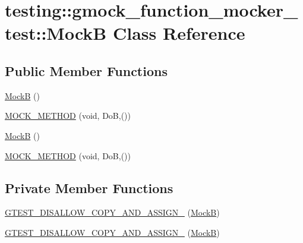 \hypertarget{classtesting_1_1gmock__function__mocker__test_1_1_mock_b}{}\section{testing\+::gmock\+\_\+function\+\_\+mocker\+\_\+test\+::MockB Class Reference}
\label{classtesting_1_1gmock__function__mocker__test_1_1_mock_b}
\subsection*{Public Member Functions}
\begin{DoxyCompactItemize}
\item 
\mbox{\hyperlink{classtesting_1_1gmock__function__mocker__test_1_1_mock_b_a8b1fcf761cea264d7687bd64e1a16fb4}{MockB}} ()
\item 
\mbox{\hyperlink{classtesting_1_1gmock__function__mocker__test_1_1_mock_b_a4e897dd85777bec4fae42b78d4222f9b}{M\+O\+C\+K\+\_\+\+M\+E\+T\+H\+OD}} (void, DoB,())
\item 
\mbox{\hyperlink{classtesting_1_1gmock__function__mocker__test_1_1_mock_b_a8b1fcf761cea264d7687bd64e1a16fb4}{MockB}} ()
\item 
\mbox{\hyperlink{classtesting_1_1gmock__function__mocker__test_1_1_mock_b_a4e897dd85777bec4fae42b78d4222f9b}{M\+O\+C\+K\+\_\+\+M\+E\+T\+H\+OD}} (void, DoB,())
\end{DoxyCompactItemize}
\subsection*{Private Member Functions}
\begin{DoxyCompactItemize}
\item 
\mbox{\hyperlink{classtesting_1_1gmock__function__mocker__test_1_1_mock_b_af42393fe0560f655590468899fd0c0fd}{G\+T\+E\+S\+T\+\_\+\+D\+I\+S\+A\+L\+L\+O\+W\+\_\+\+C\+O\+P\+Y\+\_\+\+A\+N\+D\+\_\+\+A\+S\+S\+I\+G\+N\+\_\+}} (\mbox{\hyperlink{classtesting_1_1gmock__function__mocker__test_1_1_mock_b}{MockB}})
\item 
\mbox{\hyperlink{classtesting_1_1gmock__function__mocker__test_1_1_mock_b_af42393fe0560f655590468899fd0c0fd}{G\+T\+E\+S\+T\+\_\+\+D\+I\+S\+A\+L\+L\+O\+W\+\_\+\+C\+O\+P\+Y\+\_\+\+A\+N\+D\+\_\+\+A\+S\+S\+I\+G\+N\+\_\+}} (\mbox{\hyperlink{classtesting_1_1gmock__function__mocker__test_1_1_mock_b}{MockB}})
\end{DoxyCompactItemize}


